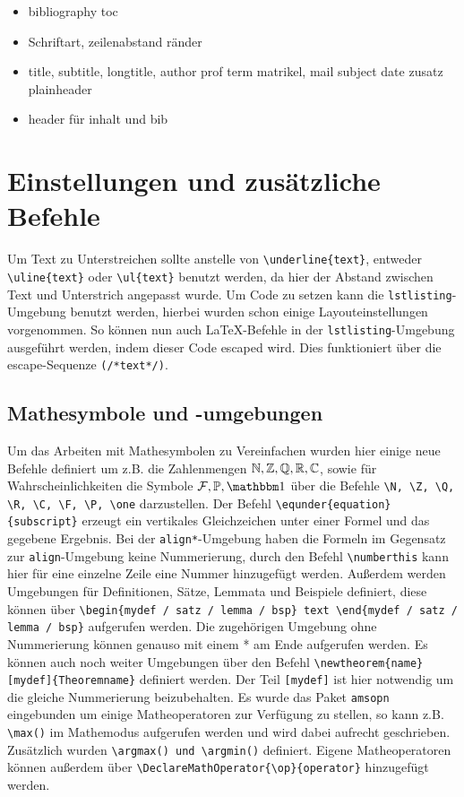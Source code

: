 \documentclass{myReport}
\begin{document}
\begin{itemize}
	\item bibliography toc
	\item Schriftart, zeilenabstand ränder
	\item title, subtitle, longtitle, author prof term matrikel, mail subject date zusatz plainheader
	\item header für inhalt und bib
\end{itemize}


\section{Einstellungen und zusätzliche Befehle}

Um Text zu Unterstreichen sollte anstelle von \lstinline|\underline{text}|, entweder \lstinline|\uline{text}| oder \lstinline|\ul{text}| benutzt werden, da hier der Abstand zwischen Text und Unterstrich angepasst wurde. Um Code zu setzen kann die \texttt{lstlisting}-Umgebung benutzt werden, hierbei wurden schon einige Layouteinstellungen vorgenommen. So können nun auch \LaTeX-Befehle in der \texttt{lstlisting}-Umgebung ausgeführt werden, indem dieser Code escaped wird. Dies funktioniert über die escape-Sequenze \lstinline|(/*text*/)|.

\subsection{Mathesymbole und -umgebungen}

Um das Arbeiten mit Mathesymbolen zu Vereinfachen wurden hier einige neue Befehle definiert um z.B. die Zahlenmengen $\mathbb{N}, \mathbb{Z}, \mathbb{Q}, \mathbb{R}, \mathbb{C}$, sowie für Wahrscheinlichkeiten die Symbole $\F, \P, \one$ über die Befehle \lstinline|\N, \Z, \Q, \R, \C, \F, \P, \one| darzustellen. Der Befehl \lstinline|\equnder{equation}{subscript}| erzeugt ein vertikales Gleichzeichen unter einer Formel und das gegebene Ergebnis. Bei der \texttt{align*}-Umgebung haben die Formeln im Gegensatz zur \texttt{align}-Umgebung keine Nummerierung, durch den Befehl \lstinline|\numberthis| kann hier für eine einzelne Zeile eine Nummer hinzugefügt werden. Außerdem werden Umgebungen für Definitionen, Sätze, Lemmata und Beispiele definiert, diese können über \lstinline|\begin{mydef / satz / lemma / bsp} text \end{mydef / satz / lemma / bsp}| aufgerufen werden. Die zugehörigen Umgebung ohne Nummerierung können genauso mit einem * am Ende aufgerufen werden. Es können auch noch weiter Umgebungen über den Befehl \lstinline|\newtheorem{name}[mydef]{Theoremname}| definiert werden. Der Teil \lstinline|[mydef]| ist hier notwendig um die gleiche Nummerierung beizubehalten. Es wurde das Paket \texttt{amsopn} eingebunden um einige Matheoperatoren zur Verfügung zu stellen, so kann z.B. \lstinline|\max()| im Mathemodus aufgerufen werden und wird dabei aufrecht geschrieben. Zusätzlich wurden \lstinline|\argmax() und \argmin()| definiert. Eigene Matheoperatoren können außerdem über \lstinline|\DeclareMathOperator{\op}{operator}| hinzugefügt werden.
\end{document}

